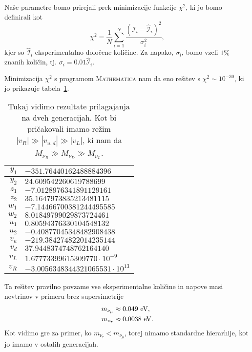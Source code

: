 Naše parametre bomo prirejali prek minimizacije funkcije $\chi^2$, ki jo bomo definirali kot
\begin{equation}
	\chi^2 = \frac{1}{N}\sum_{i = 1}^N \frac{(\mathcal{I}_i - \hat{\mathcal{I}}_i)^2}{\sigma_i^2},
\end{equation}
kjer so $\hat{\mathcal{I}}_i$ eksperimentalno določene količine. Za napako, $\sigma_i$, bomo vzeli
$1\%$ znanih količin, tj. $\sigma_i = 0.01 \hat{\mathcal{I}}_i$.

Minimizacija $\chi^2$ s programom \textsc{Mathematica} nam da eno rešitev s $\chi^2 \sim 10^{-30}$,
ki jo prikazuje tabela~\ref{2Dresult}.
\begin{table}[H]\centering
	\caption{Tukaj vidimo rezultate prilagajanja na dveh generacijah. Kot bi pričakovali imamo
		režim $|v_R| \gg |v_{u,d}| \gg |v_L|$, ki nam da $M_{\nu_R} \gg M_{\nu_D} \gg M_{\nu_L}$.}
	\begin{tabular}{r | l}
		$y_1$ & $-351.76440162488884396$ \\
		\hline
		$y_2$ & $24.609542260619788699$ \\
		\hline
		$z_1$ & $-7.0128976341891129161$ \\
		\hline
		$z_2$ & $35.1647973835213481115$ \\
		\hline
		$w_1$ & $-7.14466700381244495585$ \\
		\hline
		$w_2$ & $8.01849799029873724461$ \\
		\hline
		$u_1$ & $0.80594376330104548132$ \\
		\hline
		$u_2$ & $-0.40877045348482908438$ \\
		\hline
		$v_u$ & $-219.384274822014235144$ \\
		\hline
		$v_d$ & $37.9448374748762164140$ \\
		\hline
		$v_L$ & $1.67773399615309770\cdot 10^{-9}$ \\
		\hline
		$v_R$ & $-3.0056348344321065531\cdot 10^{13}$ \\
	\end{tabular}
	\label{2Dresult}
\end{table}
\noindent Ta rešitev pravilno povzame vse eksperimentalne količine in napove masi nevtrinov v primeru brez
supersimetrije
\begin{align}
	m_{\nu_\mu} &\approx 0.049\ \text{eV}, \notag \\
	m_{\nu_\tau} &\approx 0.0038\ \text{eV}.
\end{align}
Kot vidimo gre za primer, ko $m_{\nu_\tau} < m_{\nu_\mu}$, torej nimamo standardne hierarhije, kot
jo imamo v ostalih generacijah.
